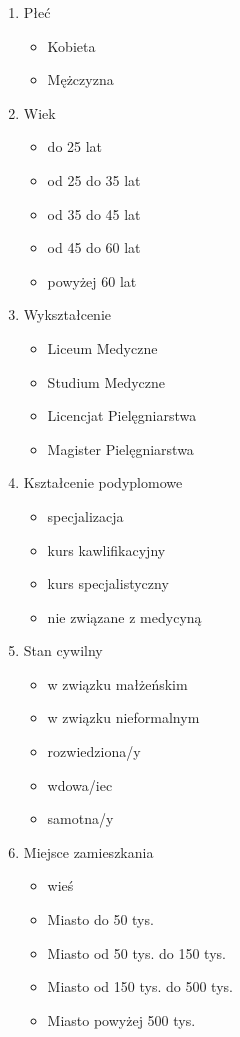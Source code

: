 \documentclass[a4paper,12pt,twoside,openright]{mwrep}
\begin{document}
\begin{enumerate}[label=(\Roman*)]
	\item{Płeć}
		\begin{itemize}
			\item{Kobieta}
			\item{Mężczyzna}
		\end{itemize}
			\vspace{\baselineskip} 
	\item{Wiek}
		\begin{itemize}
			\item{do 25 lat}
			\item{od 25 do 35 lat}
			\item{od 35 do 45 lat}
			\item{od 45 do 60 lat}
			\item{powyżej 60 lat}
		\end{itemize}
			\vspace{\baselineskip} 
	\item{Wykształcenie}
		\begin{itemize}
			\item{Liceum Medyczne}
			\item{Studium Medyczne}
			\item{Licencjat Pielęgniarstwa}
			\item{Magister Pielęgniarstwa}
		\end{itemize}
			\vspace{\baselineskip} 
	\item{Kształcenie podyplomowe}
		\begin{itemize}
			\item{specjalizacja}
			\item{kurs kawlifikacyjny}
			\item{kurs specjalistyczny}
			\item{nie związane z medycyną}
		\end{itemize}
			\vspace{\baselineskip} 
	\item{Stan cywilny}
		\begin{itemize}
			\item{w związku małżeńskim}
			\item{w związku nieformalnym}
			\item{rozwiedziona/y}
			\item{wdowa/iec}
			\item{samotna/y}
		\end{itemize}
			\vspace{\baselineskip} 
	\item{Miejsce zamieszkania}
		\begin{itemize}
			\item{wieś}
			\item{Miasto do 50 tys.}
			\item{Miasto od 50 tys. do 150 tys.}
			\item{Miasto od 150 tys. do 500 tys.}
			\item{Miasto powyżej 500 tys.}
		\end{itemize}
			\vspace{\baselineskip} 

\end{enumerate}
\end{document}
